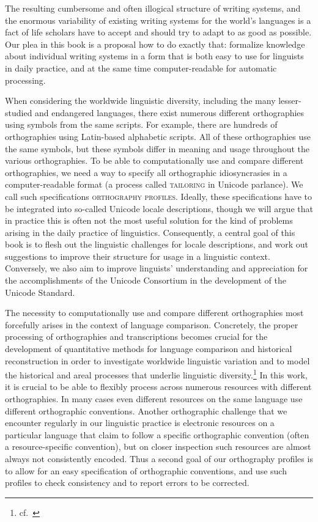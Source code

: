The resulting cumbersome and often illogical structure of writing systems, and
the enormous variability of existing writing systems for the world's languages
is a fact of life scholars have to accept and should try to adapt to as good as
possible. Our plea in this book is a proposal how to do exactly that: formalize 
knowledge about individual writing systems in a form that is both easy to use 
for linguists in daily practice, and at the same time computer-readable for 
automatic processing.

When considering the worldwide linguistic diversity, including the many
lesser-studied and endangered languages, there exist numerous different
orthographies using symbols from the same scripts. For example, there are
hundreds of orthographies using Latin-based alphabetic scripts. All of these
orthographies use the same symbols, but these symbols differ in meaning and
usage throughout the various orthographies. To be able to computationally use
and compare different orthographies, we need a way to specify all orthographic
idiosyncrasies in a computer-readable format (a process called
\textsc{tailoring} in Unicode parlance). We call such specifications
\textsc{orthography profiles}. Ideally, these specifications have to be
integrated into so-called Unicode locale descriptions, though we will argue that
in practice this is often not the most useful solution for the kind of problems
arising in the daily practice of linguistics. Consequently, a central goal of
this book is to flesh out the linguistic challenges for locale descriptions,
and work out suggestions to improve their structure for usage in a linguistic
context. Conversely, we also aim to improve linguists' understanding and
appreciation for the accomplishments of the Unicode Consortium in the
development of the Unicode Standard.

The necessity to computationally use and compare different orthographies most
forcefully arises in the context of language comparison. Concretely, the proper
processing of orthographies and transcriptions becomes crucial for the
development of quantitative methods for language comparison and historical
reconstruction in order to investigate worldwide linguistic variation and to
model the historical and areal processes that underlie linguistic
diversity.\footnote{
cf.~\citet{Steiner_etal2011,List2012,List2012a,ListMoran2013,MoranProkic2013}}
In this work, it is crucial to be able to flexibly process across numerous
resources with different orthographies. In many cases even different resources
on the same language use different orthographic conventions. Another
orthographic challenge that we encounter regularly in our linguistic practice is
electronic resources on a particular language that claim to follow a specific
orthographic convention (often a resource-specific convention), but on closer
inspection such resources are almost always not consistently encoded. Thus a
second goal of our orthography profiles is to allow for an easy specification of
orthographic conventions, and use such profiles to check consistency and to
report errors to be corrected.

